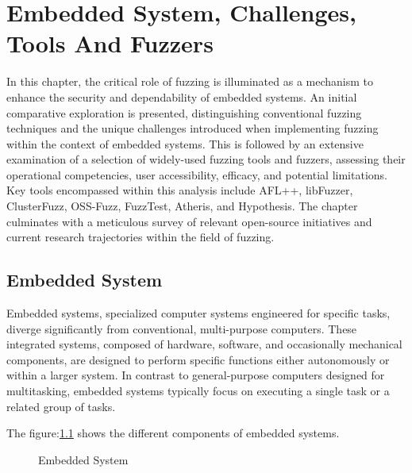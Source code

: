 \vspace{21.5pt}
\chapter{Embedded System, Challenges, Tools And Fuzzers}\label{sec:embedded_system}
In this chapter, the critical role of fuzzing is illuminated as a mechanism to
enhance the security and dependability of embedded systems. An initial
comparative exploration is presented, distinguishing conventional fuzzing
techniques and the unique challenges introduced when implementing fuzzing
within the context of embedded systems. This is followed by an extensive
examination of a selection of widely-used fuzzing tools and fuzzers,
assessing their operational competencies, user accessibility, efficacy, and
potential limitations. Key tools encompassed within this analysis include
AFL++\cite{257204}, libFuzzer\cite{libFuzze17:online}, ClusterFuzz\cite{ClusterF90:online},
OSS-Fuzz\cite{GitHubgo49:online}, FuzzTest\cite{GitHubgo59:online}, Atheris\cite{atheris2020},
and Hypothesis\cite{GitHubHy1:online}. The chapter culminates with a meticulous
survey of relevant open-source initiatives and current research trajectories
within the field of fuzzing.

\section{Embedded System}

Embedded systems, specialized computer systems engineered for specific tasks,
diverge significantly from conventional, multi-purpose computers.
These integrated systems, composed of hardware, software, and occasionally
mechanical components, are designed to perform specific functions either
autonomously or within a larger system. In contrast to general-purpose
computers designed for multitasking, embedded systems typically focus on
executing a single task or a related group of
tasks\cite{marwedel2021embedded}\cite{yun2022fuzzing}\cite{Introduc26:online}.

The figure:\ref{fig:Embedded_System} shows the different components of embedded systems.

\begin{figure}[h]
        \centering
        \caption{Embedded System\cite{Introduc82:online}}\label{fig:Embedded_System}
\end{figure}



